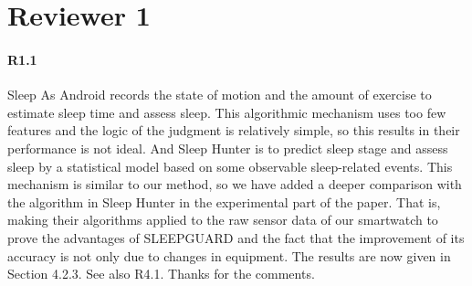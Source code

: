 \section*{Reviewer 1}
\vspace{-2mm}
\paragraph{R1.1}
Sleep As Android records the state of motion and the amount of exercise to estimate sleep time and assess sleep. This algorithmic mechanism
uses too few features and the logic of the judgment is relatively simple, so this results in their performance is not ideal. And Sleep
Hunter is to predict sleep stage and assess sleep by a statistical model based on some observable sleep-related events. This mechanism is
similar to our method, so we have added a deeper comparison with the algorithm in Sleep Hunter in the experimental part of the paper. That
is, making their algorithms applied to the raw sensor data of our smartwatch to prove the advantages of SLEEPGUARD and the fact that the
improvement of its accuracy is not only due to changes in equipment. The results are now given in Section 4.2.3. See also R4.1. Thanks for
the comments.
